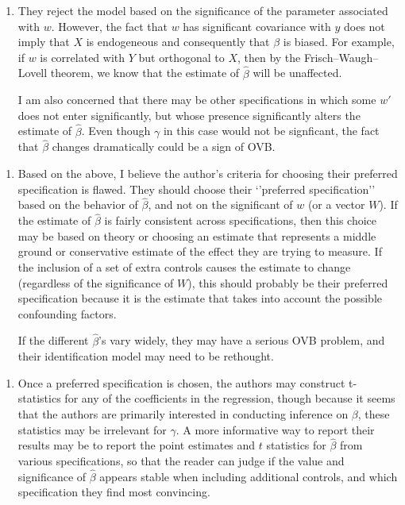 \documentclass[11pt]{exam}
\providecommand{\tightlist}{%
      \setlength{\itemsep}{0pt}\setlength{\parskip}{0pt}}
\begin{document}
\begin{enumerate}
\def\labelenumi{(\roman{enumi})}
\tightlist
\item
  They reject the model based on the significance of the parameter
  associated with \(w\). However, the fact that \(w\) has significant
  covariance with \(y\) does not imply that \(X\) is endogeneous and
  consequently that \(\beta\) is biased. For example, if \(w\) is
  correlated with \(Y\) but orthogonal to \(X\), then by the
  Frisch--Waugh--Lovell theorem, we know that the estimate of \(\hat{\beta}\) will
  be unaffected.

  I am also concerned that there may be other specifications in which some
\(w'\) does not enter significantly, but whose presence significantly
alters the estimate of \(\hat{\beta}\). Even though \(\gamma\) in this case would
not be signficant, the fact that \(\hat{\beta}\) changes dramatically could be a
sign of OVB.
\end{enumerate}

\begin{enumerate}
\def\labelenumi{(\roman{enumi})}
\setcounter{enumi}{1}
\tightlist
\item
  Based on the above, I believe the author's criteria for choosing their
  preferred specification is flawed. They should choose their
  `'preferred specification'' based on the behavior of \(\hat{\beta}\),
  and not on the significant of \(w\) (or a vector \(W\)). If the
  estimate of \(\hat{\beta}\) is fairly consistent across
  specifications, then this choice may be based on theory or choosing an
  estimate that represents a middle ground or conservative estimate of
  the effect they are trying to measure. If the inclusion of a set of
  extra controls causes the estimate to change (regardless of the
  significance of \(W\)), this should probably be their preferred
  specification because it is the estimate that takes into account the
  possible confounding factors.\par\vspace{0.2cm}

  If the different \(\hat{\beta}\)'s vary widely, they may have a serious
OVB problem, and their identification model may need to be rethought.
\end{enumerate}


\begin{enumerate}
\def\labelenumi{(\roman{enumi})}
\setcounter{enumi}{2}
\tightlist
\item
  Once a preferred specification is chosen, the authors may construct
  t-statistics for any of the coefficients in the regression, though
  because it seems that the authors are primarily interested in
  conducting inference on \(\beta\), these statistics may be irrelevant
  for \(\gamma\). A more informative way to report their results
  may be to report the point estimates and $t$ statistics for \(\hat{\beta}\)
  from various specifications, so that the reader can judge if the value
  and significance of \(\hat{\beta}\) appears stable when including additional
  controls, and which specification they find most convincing.
\end{enumerate}
\end{document}
